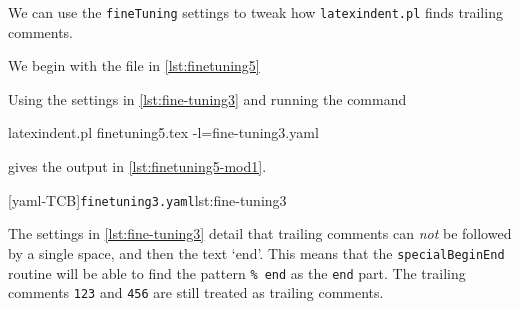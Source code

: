  \begin{example}
 We can use the \texttt{fineTuning} settings to tweak how \texttt{latexindent.pl} finds
 trailing comments. 

 We begin with the file in \cref{lst:finetuning5}


 Using the settings in \cref{lst:fine-tuning3} and running the command

 \begin{commandshell}
latexindent.pl finetuning5.tex -l=fine-tuning3.yaml
\end{commandshell}

 gives the output in \cref{lst:finetuning5-mod1}.

 \begin{cmhtcbraster}[raster column skip=.01\linewidth]
  [yaml-TCB]{\texttt{finetuning3.yaml}}{lst:fine-tuning3}
 \end{cmhtcbraster}

 The settings in \cref{lst:fine-tuning3} detail that trailing comments can \emph{not} be
 followed by a single space, and then the text `end'. This means that the
 \texttt{specialBeginEnd} routine will be able to find the pattern \lstinline!% end! as
 the \texttt{end} part. The trailing comments \texttt{123} and \texttt{456} are still
 treated as trailing comments.
 \end{example}
